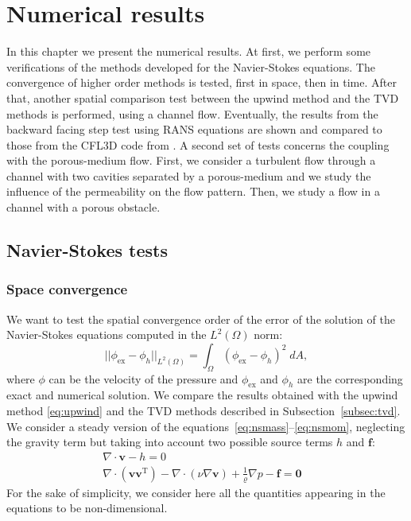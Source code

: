 \chapter{Numerical results} \label{chap:results}
In this chapter we present the numerical results.
At first, we perform some verifications of the methods developed for the Navier-Stokes equations.
The convergence of higher order methods is tested, first in space, 
then in time. After that, another spatial comparison test between the upwind 
method 
and the TVD methods is performed, using a channel flow. Eventually, the results 
from the backward facing step test using RANS equations are shown and 
compared to those from the CFL3D code from \cite{web:nasa}. 
A second set of tests concerns the coupling with the porous-medium flow. First, we consider a turbulent flow through a channel with two cavities separated by a porous-medium and we study the influence of the permeability on the flow pattern. Then, we study a flow in a channel with a porous obstacle.
%
%
\section{Navier-Stokes tests}
\subsection{Space convergence} \label{subsec:conv}
We want to test the spatial convergence order of the error of the 
solution of the Navier-Stokes equations computed in the $L^2(\Omega)$ norm:
\begin{equation}
	|\!|\phi_\text{ex} - \phi_h|\!|_{L^2(\Omega)} = \int_{\Omega} 
	(\phi_\text{ex} - 
	\phi_h)^2 \; dA,
\end{equation}
where $\phi$ can be the velocity of the pressure and $\phi_\text{ex}$ and 
$\phi_h$ 
are the corresponding exact and numerical solution.
We compare the results obtained with 
the upwind method \eqref{eq:upwind} and the TVD methods described in 
Subsection~\ref{subsec:tvd}.\\
We consider a steady version of the 
equations~\eqref{eq:nsmass}--\eqref{eq:nsmom}, neglecting the gravity term but taking into account two possible source terms $h$ and $\mathbf{f}$:
\begin{align}
	\label{eq:nssteadymass} \nabla \cdot \mathbf{v} -h = 0&\\
	\label{eq:nssteadymom} \nabla \cdot (\mathbf{v} \mathbf{v}^\mathrm{T}) - 
	\nabla \cdot (\nu \nabla \mathbf{v}) + \frac{1}{\varrho}\nabla p  
	-\mathbf{f} = \mathbf{0}&
\end{align}
For the sake of simplicity, we consider here 
all the quantities appearing in the equations to be non-dimensional.
%
